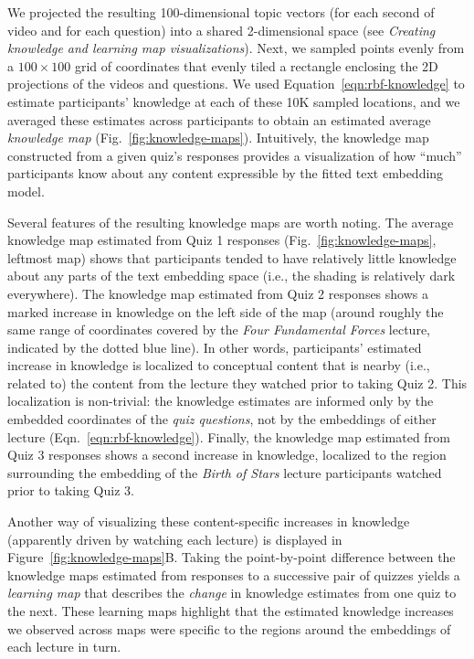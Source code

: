 \documentclass[10pt]{article}
\begin{document}
We projected the resulting 100-dimensional topic vectors (for each second of
video and for each question) into a shared 2-dimensional space (see
\textit{Creating knowledge and learning map visualizations}). Next, we sampled
points evenly from a $100 \times 100$ grid of coordinates that evenly tiled a
rectangle enclosing the 2D projections of the videos and questions. We used
Equation~\ref{eqn:rbf-knowledge} to estimate participants' knowledge at each of
these 10K sampled locations, and we averaged these estimates across
participants to obtain an estimated average \textit{knowledge map}
(Fig.~\ref{fig:knowledge-maps}). Intuitively, the knowledge map constructed
from a given quiz's responses provides a visualization of how ``much''
participants know about any content expressible by the fitted text embedding
model.

Several features of the resulting knowledge maps are worth noting. The average
knowledge map estimated from Quiz 1 responses (Fig.~\ref{fig:knowledge-maps},
leftmost map) shows that participants tended to have relatively little
knowledge about any parts of the text embedding space (i.e., the shading is
relatively dark everywhere). The knowledge map estimated from Quiz 2 responses
shows a marked increase in knowledge on the left side of the map (around
roughly the same range of coordinates covered by the \textit{Four Fundamental
Forces} lecture, indicated by the dotted blue line). In other words,
participants' estimated increase in knowledge is localized to conceptual
content that is nearby (i.e., related to) the content from the lecture they
watched prior to taking Quiz 2. This localization is non-trivial: the knowledge
estimates are informed only by the embedded coordinates of the \textit{quiz
questions}, not by the embeddings of either lecture
(Eqn.~\ref{eqn:rbf-knowledge}). Finally, the knowledge map estimated from Quiz
3 responses shows a second increase in knowledge, localized to the region
surrounding the embedding of the \textit{Birth of Stars} lecture participants
watched prior to taking Quiz 3.

Another way of visualizing these content-specific increases in knowledge
(apparently driven by watching each lecture) is displayed in
Figure~\ref{fig:knowledge-maps}B. Taking the point-by-point difference between
the knowledge maps estimated from responses to a successive pair of quizzes
yields a \textit{learning map} that describes the \textit{change} in knowledge
estimates from one quiz to the next. These learning maps highlight that the
estimated knowledge increases we observed across maps were specific to the
regions around the embeddings of each lecture in turn.
\end{document}
